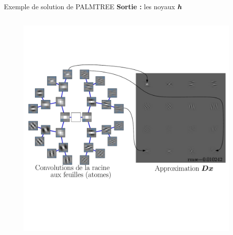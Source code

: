 \begin{frame}{Exemple de solution de PALMTREE}
\textbf{Sortie :} les noyaux $\bm{h}$
\begin{columns}
\begin{column}{1\textwidth} \begin{figure}\centering
	\includegraphics[width=\textwidth]{figures/tree-learn-setup/outputs.pdf}
\end{figure}\end{column}
\end{columns}
\end{frame}


